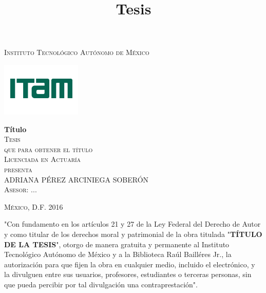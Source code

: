 \documentclass[letterpaper,oneside,11pt,review]{book}
\theoremstyle{plain}
\begin{document}
\pagestyle{empty} %

\title{Tesis} %

\begin{titlepage}
\begin{center}

\textsc{\Large Instituto Tecnol\'ogico Aut\'onomo de M\'exico}\\[4em]

\begin{center}
	\includegraphics{DocumentosLaTex/ITAM_2016}
\end{center}

\vspace{4em}

{\sc \huge {\bf T\'itulo}}\\[4em]

\textsc{\large Tesis}\\[1em]

\textsc{que para obtener el t\'itulo}\\[1em]

\textsc{Licenciada en Actuar\'ia}\\[1em]

\textsc{presenta}\\[1em]

\textsc{\Large ADRIANA P\'EREZ ARCINIEGA SOBER\'ON }\\[1em]

\textsc{\large Asesor: ...}

\end{center}

\vspace*{\fill}
\textsc{M\'exico, D.F. \hspace*{\fill} 2016}

\end{titlepage}


\thispagestyle{empty}
\vspace*{\fill}
\begingroup
"Con fundamento en los art\'iculos 21 y 27 de la Ley Federal del Derecho de Autor y como titular de los derechos moral y patrimonial de la obra titulada "\textbf{T\'ITULO DE LA TESIS}", otorgo de manera gratuita y permanente al Instituto Tecnol\'ogico Aut\'onomo de M\'exico y a la Biblioteca Ra\'ul Baill\'eres Jr., la autorizaci\'on para que fijen la obra en cualquier medio, incluido el electr\'onico, y la divulguen entre sus usuarios, profesores, estudiantes o terceras personas, sin que pueda percibir por tal divulgaci\'on una contraprestaci\'on".
\end{document}
